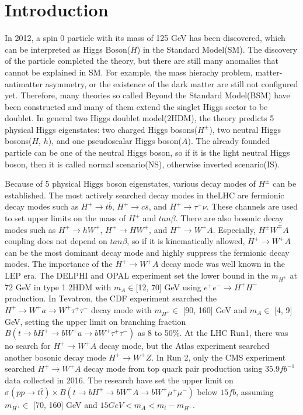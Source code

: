 \documentclass[
12pt, %
a4paper, %
oneside, %
headinclude,footinclude, %
BCOR5mm, %
]{scrartcl}
\begin{document}
\section{Introduction}
In 2012, a spin 0 particle with its mass of 125 GeV has been discovered,
which can be interpreted as Higgs Boson($H$) in the Standard Model(SM).
The discovery of the particle completed the theory, but there are still many anomalies
that cannot be explained in SM. For example, the mass hierachy problem, matter-antimatter
asymmetry, or the existence of the dark matter are still not configured yet. Therefore, many
theories so called Beyond the Standard Model(BSM) have been constructed and many of them
extend the singlet Higgs sector to be doublet. In general two Higgs doublet model(2HDM), the
theory predicts 5 physical Higgs eigenstates: two charged Higgs bosons($H^{\pm}$),
two neutral Higgs bosons($H$, $h$), and one pseudoscalar Higgs boson($A$).
The already founded particle can be one of the neutral Higgs boson, so if it is the light neutral
Higgs boson, then it is called normal scenario(NS), otherwise inverted scenario(IS).

Because of 5 physical Higgs boson eigenstates, various decay modes
of $H^{\pm}$ can be established. The most actively searched decay modes 
in theLHC are fermionic decay modes such as
$H^+ \rightarrow t\bar{b}$, 
$H^+ \rightarrow c\bar{s}$, and 
$H^+ \rightarrow \tau^+\nu$.
These channels are used to set upper limits on the mass of $H^+$ and $tan\beta$.
There are also bosonic decay modes such as
$H^+ \rightarrow hW^+$,
$H^+ \rightarrow HW^+$, and
$H^+ \rightarrow W^+A$.
Especially, $H^{\pm}W^{\mp}A$ coupling does not depend on $tan\beta$,
so if it is kinematically allowed, $H^+ \rightarrow W^+A$ can be the most dominant
decay mode and highly suppress the fermionic decay modes.
The importance of the $H^+ \rightarrow W^+A$ decay mode was well known in the LEP era.
The DELPHI and OPAL experiment set the lower bound in the $m_{H^+}$ at 72 GeV
in type 1 2HDM with $m_A \in$[12, 70] GeV using $e^+e^- \rightarrow H^+H^-$ production.
In Tevatron, the CDF experiment searched the
$H^+ \rightarrow W^+a \rightarrow W^+\tau^+\tau^-$
decay mode with $m_{H^+} \in$ [90, 160] GeV and $m_A \in$ [4, 9] GeV,
setting the upper limit on branching fraction 
$B(t \rightarrow bH^+ \rightarrow bW^+a \rightarrow bW^+\tau^+\tau^-)$
as 8 to 50\%. At the LHC Run1, there was no search for $H^+ \rightarrow W^+A$ decay mode,
but the Atlas experiment searched another bosonic decay mode $H^+ \rightarrow W^+Z$. In Run 2,
only the CMS  experiment searched $H^+ \rightarrow W^+A$ decay mode from top quark pair production 
using $35.9 fb^{-1}$ data collected in 2016. The research have set the upper limit on
$\sigma (pp \rightarrow t\bar{t} ) \times B(t \rightarrow bH^+ \rightarrow bW^+A \rightarrow bW^+\mu^+\mu^-)$
below $15 fb$, 
assuming $m_{H^+} \in$ [70, 160] GeV and $15 GeV < m_A < m_t - m_{H^+}$.
\end{document}
